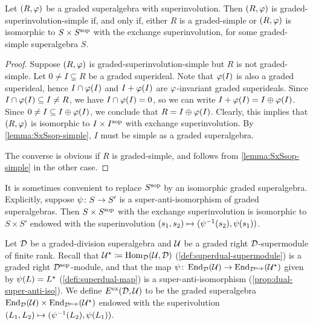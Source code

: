 \begin{prop}\label{prop:only-SxSsop-is-simple}
	Let $(R, \varphi)$ be a 
	graded superalgebra with superinvolution. 
	Then $(R, \varphi)$ is 
	graded-superinvolution-simple if, and only if, either $R$ is a graded-simple or $(R, \varphi)$ is isomorphic to $S\times S^{\mathrm{sop}}$ with the exchange superinvolution, for some graded-simple superalgebra $S$.
\end{prop}

\begin{proof}
	Suppose $(R, \varphi)$ is 
	graded-superinvolution-simple but $R$ is not graded-simple. 
	Let $0 \neq I \subsetneq R$ be a graded superideal.
	Note that $\varphi(I)$ is also a graded superideal, hence $I \cap \varphi(I)$ and $I + \varphi (I)$ are $\varphi$-invariant graded superideals. 
	Since $I \cap \varphi(I) \subseteq I \neq R$, we have $I \cap \varphi(I) = 0$, so we can write $I + \varphi (I) = I \oplus \varphi (I)$. 
	Since $0 \neq I \subseteq I \oplus \varphi (I)$, we conclude that $R = I \oplus \varphi (I)$.
	Clearly, this implies that $(R, \varphi)$ is isomorphic to $I \times I^{\mathrm{sop}}$ with exchange superinvolution. 
	By \cref{lemma:SxSsop-simple}, $I$ must be simple as a graded superalgebra. 
	
	The converse is obvious if $R$ is graded-simple, and follows from \cref{lemma:SxSsop-simple} in the other case.
\end{proof}
 
It is sometimes convenient to replace $S^{\mathrm{sop}}$ by an isomorphic graded superalgebra. 
Explicitly, suppose $\psi\colon S \to S'$ is a super-anti-isomorphism of graded superalgebras. 
Then $S\times S^{\mathrm{sop}}$ with the exchange superinvolution is isomorphic to $S\times S'$ endowed with the superinvolution $(s_1, s_2) \mapsto (\psi^{-1} (s_2), \psi (s_1))$. 

\begin{defi}\label{defi:superdual-exchange}
    Let $\mathcal{D}$ be a graded-division superalgebra and $\mathcal U$ be a graded right $\mathcal{D}$-supermodule of finite rank. 
    Recall that $\mathcal U^\star \coloneqq \operatorname{Hom}_{\mathcal{D}}(\mathcal U, \mathcal{D})$ (\cref{def:superdual-supermodule}) is a graded right $\mathcal{D}^{\mathrm{sop}}$-module, and that the map $\psi\colon \operatorname{End}_{\mathcal{D}} (\mathcal U) \to \operatorname{End}_{\mathcal{D}^{\mathrm{sop}}} (\mathcal U^\star)$ given by $\psi(L) = L^\star$ (\cref{defi:superdual-map}) is a super-anti-isomorphism (\cref{prop:dual-super-anti-iso}). 
    We define $E^{\mathrm{ex}} (\mathcal{D}, \mathcal U)$ to be the graded superalgebra $\operatorname{End}_{\mathcal{D}} (\mathcal U) \times \operatorname{End}_{\mathcal{D}^{\mathrm{sop}}} (\mathcal U^\star)$ endowed with the superivolution $(L_1, L_2) \mapsto (\psi^{-1}(L_2), \psi(L_1))$.
\end{defi}

